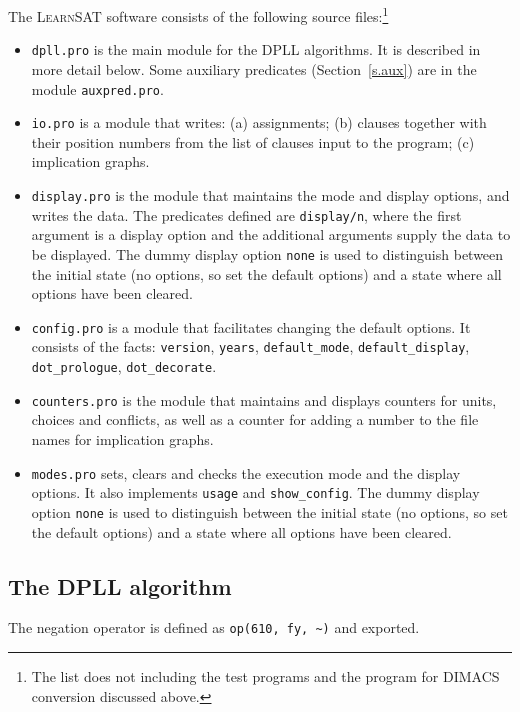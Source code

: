 \documentclass[11pt]{article}
\newcommand*{\p}[1]{\textup{\texttt{#1}}}
\newcommand*{\ls}{\textsc{LearnSAT}}
\begin{document}
The \ls{} software consists of the following source files:\footnote{The
list does not including the test programs and the program for DIMACS
conversion discussed above.}

\begin{itemize}
\item \p{dpll.pro} is the main module for the DPLL algorithms. It is
described in more detail below. Some auxiliary predicates
(Section~\ref{s.aux}) are in the module \p{auxpred.pro}.

\item \p{io.pro} is a module that writes: (a) assignments; (b) clauses
together with their position numbers from the list of clauses input to
the program; (c) implication graphs.

\item \p{display.pro} is the module that maintains the mode and display
options, and writes the data. The predicates defined are \p{display/n},
where the first argument is a display option and the additional
arguments supply the data to be displayed. The dummy display option
\p{none} is used to distinguish between the initial state (no options,
so set the default options) and a state where all options have been
cleared.

\item \p{config.pro} is a module that facilitates changing the default
options. It consists of the facts: \p{version}, \p{years},
\p{default\_mode}, \p{default\_display}, \p{dot\_prologue},
\p{dot\_decorate}.

\item \p{counters.pro} is the module that maintains and displays counters
for units, choices and conflicts, as well as a counter for adding a
number to the file names for implication graphs.

\item \p{modes.pro} sets, clears and checks the execution mode and the
display options. It also implements \p{usage} and \p{show\_config}. The
dummy display option \p{none} is used to distinguish between the initial
state (no options, so set the default options) and a state where all
options have been cleared.

\end{itemize}

\subsection{The DPLL algorithm}

The negation operator is defined as \verb+op(610, fy, ~)+ and exported.
\end{document}
